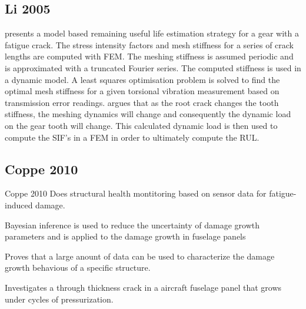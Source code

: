\subsection{Li 2005}
\cite{Li2005a} presents a model based remaining useful life estimation strategy for a gear with a fatigue crack. The stress intensity factors and mesh stiffness for a series of crack lengths are computed with FEM. The meshing stiffness is assumed periodic and is approximated with a truncated Fourier series. The computed stiffness is used in a dynamic model. A least squares optimisation problem is solved to find the optimal mesh stiffness for a given torsional vibration measurement based on transmission error readings. \cite{Li2005a} argues that as the root crack changes the tooth stiffness, the meshing dynamics will change and consequently the dynamic load on the gear tooth will change. This calculated dynamic load is then used to compute the SIF's in a FEM in order to ultimately compute the RUL.




\subsection{Coppe 2010}
Coppe 2010 Does structural health montitoring based on sensor data for fatigue-induced damage. 

Bayesian inference is used to reduce the uncertainty of damage growth parameters and is applied to the damage growth in fuselage panels

Proves that a large anount of data can be used to characterize the damage growth behavious of a specific structure.

Investigates a through thickness crack in a aircraft fuselage panel that grows under cycles of pressurization.



